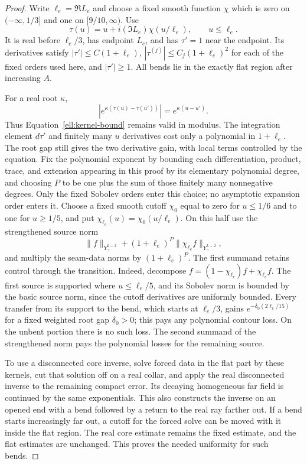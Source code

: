 \begin{proof}
Write $\ell_e=\Re L_e$ and choose a fixed smooth function $\chi$
which is zero on $(-\infty,1/3]$ and one on $[9/10,\infty)$.
Use
\[
 \tau(u)=u+i(\Im L_e)\chi(u/\ell_e),\qquad u\le\ell_e.
\]
It is real before $\ell_e/3$, has endpoint $L_e$, and has
$\tau'=1$ near the endpoint.  Its derivatives satisfy
$|\tau'|\le C(1+\ell_e)$, $|\tau^{(j)}|\le C_j(1+\ell_e)^2$
for each of the fixed orders used here, and $|\tau'|\ge1$.
All bends lie in the exactly flat region after increasing $A$.

For a real root $\kappa$,
\[
 |e^{\kappa(\tau(u)-\tau(u'))}|
       =e^{\kappa(u-u')}.
\]
Thus Equation~\eqref{ell:kernel-bound} remains valid in modulus.
The integration element $d\tau'$ and finitely many $u$ derivatives
cost only a polynomial in $1+\ell_e$.  The root gap still gives
the two derivative gain, with local terms controlled by the
equation.  Fix the polynomial exponent by bounding each
differentiation, product, trace, and extension appearing in this
proof by its elementary polynomial degree, and choosing $P$ to
be one plus the sum of those finitely many nonnegative degrees.
Only the fixed Sobolev orders enter this choice; no asymptotic
expansion order enters it.  Choose a fixed smooth cutoff
$\chi_0$ equal to zero for $u\le1/6$ and to one for $u\ge1/5$,
and put $\chi_{\ell_e}(u)=\chi_0(u/\ell_e)$.  On this half use
the strengthened source norm
\[
 \|f\|_{Y^{k-2}_\gamma}
       +(1+\ell_e)^P\|\chi_{\ell_e}f\|_{Y^{k-2}_\gamma},
\]
and multiply the seam-data norms by $(1+\ell_e)^P$.
The first summand retains control through the transition.
Indeed, decompose $f=(1-\chi_{\ell_e})f+\chi_{\ell_e}f$.
The first source is supported where $u\le\ell_e/5$, and its
Sobolev norm is bounded by the basic source norm, since the
cutoff derivatives are uniformly bounded.  Every transfer
from its support to the bend, which starts at $\ell_e/3$,
gains $e^{-\delta_0(2\ell_e/15)}$ for a fixed weighted root
gap $\delta_0>0$; this pays any polynomial contour loss.
On the unbent portion there is no such loss.  The second
summand of the strengthened norm pays the polynomial losses
for the remaining source.

To use a disconnected core inverse, solve forced data in the flat
part by these kernels, cut that solution off on a real collar,
and apply the real disconnected inverse to the remaining compact
error.  Its decaying homogeneous far field is continued by the
same exponentials.  This also constructs the inverse on an opened
end with a bend followed by a return to the real ray farther out.
If a bend starts increasingly far out, a cutoff for the forced
solve can be moved with it inside the flat region.  The real
core estimate remains the fixed estimate, and the flat estimates
are unchanged.  This proves the needed uniformity for such bends.


\end{proof}
